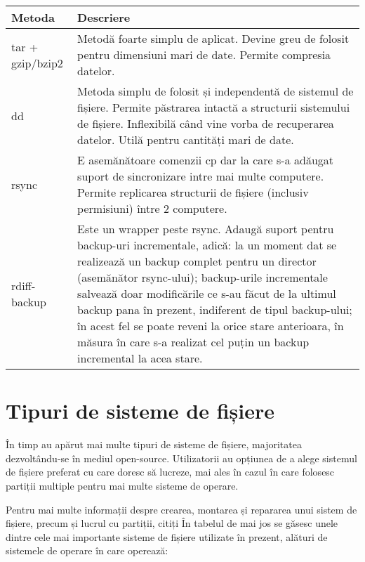 \begin{table}[htb]
\begin{center}
	\begin{tabular}{ p{} p{} }
	\toprule
		\textbf{Metoda} & \textbf{Descriere} \\
	\midrule
		tar + gzip/bzip2 & Metodă foarte simplu de aplicat. Devine greu
		de folosit pentru dimensiuni mari de date. Permite compresia
		datelor. \\
	\midrule
		dd & Metoda simplu de folosit și independentă de sistemul de
		fișiere. Permite păstrarea intactă a structurii sistemului de
		fișiere. Inflexibilă când vine vorba de recuperarea datelor.
		Utilă pentru cantități mari de date. \\
	\midrule
		rsync & E asemănătoare comenzii cp dar la care s-a adăugat
		suport de sincronizare intre mai multe computere. Permite
		replicarea structurii de fișiere (inclusiv permisiuni) între 2
		computere. \\
	\midrule
		rdiff-backup & Este un wrapper peste rsync. Adaugă suport pentru
		backup-uri incrementale, adică: la un moment dat se realizează
		un backup complet pentru un director (asemănător rsync-ului);
		backup-urile incrementale salvează doar modificările ce s-au
		făcut de la ultimul backup pana în prezent, indiferent de tipul
		backup-ului; în acest fel se poate reveni la orice stare
		anterioara, în măsura în care s-a realizat cel puțin un backup
		incremental la acea stare. \\
	\bottomrule
	\end{tabular}
	\label{table:file-system-backup-cmd}
\end{center}
\end{table}

\section{Tipuri de sisteme de fișiere}
\label{sec:file-system-fs-types}

În timp au apărut mai multe tipuri de sisteme de fișiere, majoritatea
dezvoltându-se în mediul open-source. Utilizatorii au opțiunea de a alege
sistemul de fișiere preferat cu care doresc să lucreze, mai ales în cazul în
care folosesc partiții multiple pentru mai multe sisteme de operare.

Pentru mai multe informații despre crearea, montarea și repararea unui sistem de
fișiere, precum și lucrul cu partiții, citiți
 În tabelul de mai jos se găsesc unele
dintre cele mai importante sisteme de fișiere utilizate în prezent, alături de
sistemele de operare în care operează:

